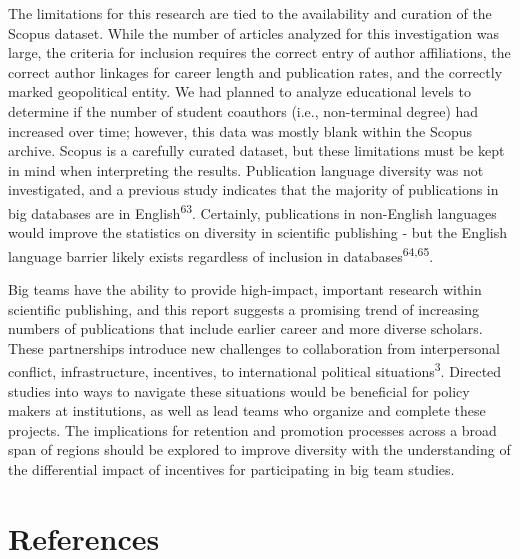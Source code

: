 \documentclass[
  man,floatsintext]{apa6}
\begin{document}
The limitations for this research are tied to the availability and
curation of the Scopus dataset. While the number of articles analyzed
for this investigation was large, the criteria for inclusion requires
the correct entry of author affiliations, the correct author linkages
for career length and publication rates, and the correctly marked
geopolitical entity. We had planned to analyze educational levels to
determine if the number of student coauthors (i.e., non-terminal degree)
had increased over time; however, this data was mostly blank within the
Scopus archive. Scopus is a carefully curated dataset, but these
limitations must be kept in mind when interpreting the results.
Publication language diversity was not investigated, and a previous
study indicates that the majority of publications in big databases are
in English\textsuperscript{63}. Certainly, publications in non-English
languages would improve the statistics on diversity in scientific
publishing - but the English language barrier likely exists regardless
of inclusion in databases\textsuperscript{64,65}.

Big teams have the ability to provide high-impact, important research
within scientific publishing, and this report suggests a promising trend
of increasing numbers of publications that include earlier career and
more diverse scholars. These partnerships introduce new challenges to
collaboration from interpersonal conflict, infrastructure, incentives,
to international political situations\textsuperscript{3}. Directed studies
into ways to navigate these situations would be beneficial for policy
makers at institutions, as well as lead teams who organize and complete
these projects. The implications for retention and promotion processes
across a broad span of regions should be explored to improve diversity
with the understanding of the differential impact of incentives for
participating in big team studies.

\newpage

\hypertarget{references}{%
\section{References}\label{references}}

\begingroup
\setlength{\parindent}{-0.5in}
\setlength{\leftskip}{0.5in}
\end{document}
